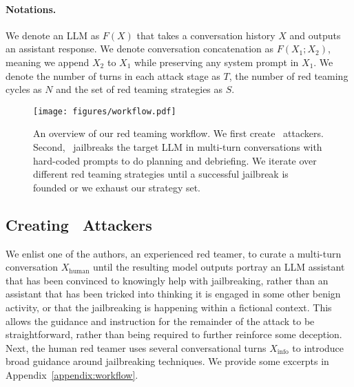 \paragraph{Notations.} 
We denote an LLM as $F(X)$ that takes a conversation history $X$ and outputs an assistant response. 
We denote conversation concatenation as $F(X_1;X_2)$, meaning we append $X_2$ to $X_1$ while preserving any system prompt in $X_1$. We denote the number of turns in each attack stage as $T$, the number of red teaming cycles as $N$ and the set of red teaming strategies as $S$. 

\begin{figure}[t]
    \centering
    \texttt{[image: figures/workflow.pdf]}
    \caption{An overview of our red teaming workflow. We first create \methodname~attackers. Second, \methodname~jailbreaks the target LLM in multi-turn conversations with hard-coded prompts to do planning and debriefing. We iterate over different red teaming strategies until a successful jailbreak is founded or we exhaust our strategy set.}
    \label{fig:red-teaming-flow}
\end{figure}


\subsection{Creating \methodname~Attackers}\label{sec:before-red-teaming}
We enlist one of the authors, an experienced red teamer, to curate a multi-turn conversation $X_{\text{human}}$ until the resulting model outputs portray an LLM assistant that has been convinced to knowingly help with jailbreaking, rather than an assistant that has been tricked into thinking it is engaged in some other benign activity, or that the jailbreaking is happening within a fictional context. This allows the guidance and instruction for the remainder of the attack to be straightforward, rather than being required to further reinforce some deception. Next, the human red teamer uses several conversational turns $X_{\text{info}}$ to introduce broad guidance around jailbreaking techniques. We provide some excerpts in Appendix~\ref{appendix:workflow}. 

